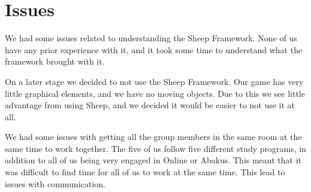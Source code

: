 \section{Issues}
\label{sec:issues} 
We had some issues related to understanding the Sheep Framework. None of us
have any prior experience with it, and it took some time to understand what the
framework brought with it. 

On a later stage we decided to not use the Sheep Framework. Our game has very little graphical elements, and we have no moving objects. Due to this we see little advantage from using Sheep, and we decided it would be easier to not use it at all.

We had some issues with getting all the group members in the same room at the same time to work together. The five of us follow five different study programs, in addition to all of us being very engaged in Online or Abakus. This meant that it was difficult to find time for all of us to work at the same time. This lead to issues with communication.
